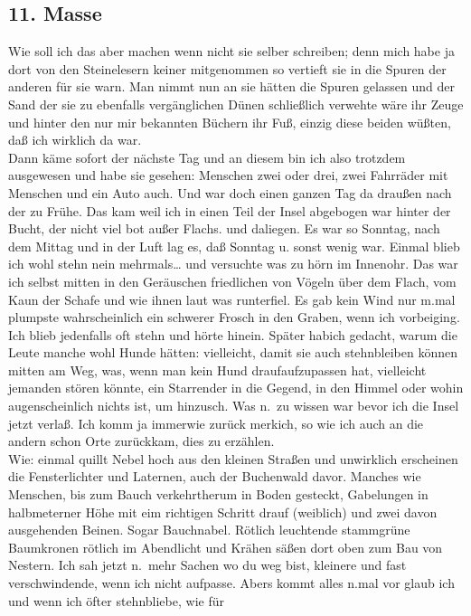 \documentclass[
]{article}
\author{}
\date{\vspace{-2.5em}}
\begin{document}
\subsection{11. Masse}\label{masse}

Wie soll ich das aber machen wenn nicht sie selber schreiben; denn mich
habe ja dort von den Steinelesern keiner mitgenommen so vertieft sie in
die Spuren der anderen für sie warn. Man nimmt nun an sie hätten die
Spuren gelassen und der Sand der sie zu ebenfalls vergänglichen Dünen
schließlich verwehte wäre ihr Zeuge und hinter den nur mir bekannten
Büchern ihr Fuß, einzig diese beiden wüßten, daß ich wirklich da war.\\
Dann käme sofort der nächste Tag und an diesem bin ich also trotzdem
ausgewesen und habe sie gesehen: Menschen zwei oder drei, zwei Fahrräder
mit Menschen und ein Auto auch. Und war doch einen ganzen Tag da draußen
nach der zu Frühe. Das kam weil ich in einen Teil der Insel abgebogen
war hinter der Bucht, der nicht viel bot außer Flachs. und daliegen. Es
war so Sonntag, nach dem Mittag und in der Luft lag es, daß Sonntag u.
sonst wenig war. Einmal blieb ich wohl stehn nein mehrmals\ldots{} und
versuchte was zu hörn im Innenohr. Das war ich selbst mitten in den
Geräuschen friedlichen von Vögeln über dem Flach, vom Kaun der Schafe
und wie ihnen laut was runterfiel. Es gab kein Wind nur m.mal plumpste
wahrscheinlich ein schwerer Frosch in den Graben, wenn ich vorbeiging.
Ich blieb jedenfalls oft stehn und hörte hinein. Später habich gedacht,
warum die Leute manche wohl Hunde hätten: vielleicht, damit sie auch
stehnbleiben können mitten am Weg, was, wenn man kein Hund
draufaufzupassen hat, vielleicht jemanden stören könnte, ein Starrender
in die Gegend, in den Himmel oder wohin augenscheinlich nichts ist, um
hinzusch. Was n.~zu wissen war bevor ich die Insel jetzt verlaß. Ich
komm ja immerwie zurück merkich, so wie ich auch an die andern schon
Orte zurückkam, dies zu erzählen.\\
Wie: einmal quillt Nebel hoch aus den kleinen Straßen und unwirklich
erscheinen die Fensterlichter und Laternen, auch der Buchenwald davor.
Manches wie Menschen, bis zum Bauch verkehrtherum in Boden gesteckt,
Gabelungen in halbmeterner Höhe mit eim richtigen Schritt drauf
(weiblich) und zwei davon ausgehenden Beinen. Sogar Bauchnabel. Rötlich
leuchtende stammgrüne Baumkronen rötlich im Abendlicht und Krähen säßen
dort oben zum Bau von Nestern. Ich sah jetzt n.~mehr Sachen wo du weg
bist, kleinere und fast verschwindende, wenn ich nicht aufpasse. Abers
kommt alles n.mal vor glaub ich und wenn ich öfter stehnbliebe, wie für
\end{document}
